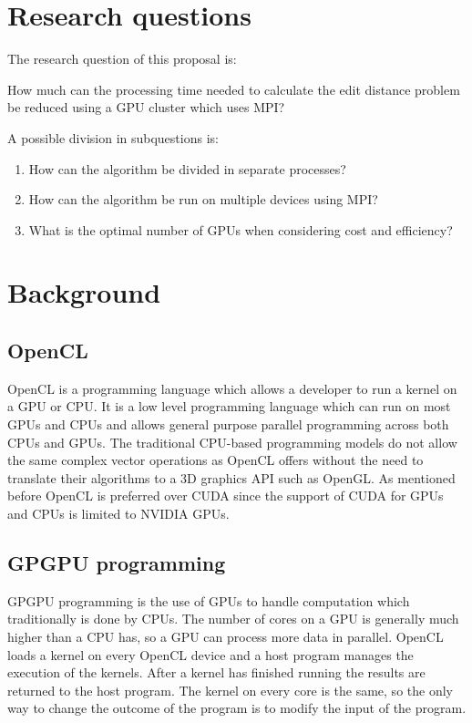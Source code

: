 \documentclass{sig-alternate-br}
\begin{document}
\section{Research questions}
The research question of this proposal is:

How much can the processing time needed to calculate the edit distance problem be reduced using a GPU cluster which uses MPI?

A possible division in subquestions is:
\begin{enumerate}
    \item How can the algorithm be divided in separate processes?
    \item How can the algorithm be run on multiple devices using MPI?
    \item What is the optimal number of GPUs when considering cost and efficiency?
\end{enumerate}

\section{Background}
\subsection{OpenCL}
OpenCL is a programming language which allows a developer to run a kernel on a GPU or CPU\cite{OpenCL}.
It is a low level programming language which can run on most GPUs and CPUs and allows general purpose parallel programming across both CPUs and GPUs.
The traditional CPU-based programming models do not allow the same complex vector operations as OpenCL offers without the need to translate their algorithms to a 3D graphics API such as OpenGL.
As mentioned before OpenCL is preferred over CUDA since the support of CUDA for GPUs and CPUs is limited to NVIDIA GPUs\cite{CUDA}.

\subsection{GPGPU programming}
GPGPU programming is the use of GPUs to handle computation which traditionally is done by CPUs.
The number of cores on a GPU is generally much higher than a CPU has, so a GPU can process more data in parallel.
OpenCL loads a kernel on every OpenCL device and a host program manages the execution of the kernels.
After a kernel has finished running the results are returned to the host program.
The kernel on every core is the same, so the only way to change the outcome of the program is to modify the input of the program.
\end{document}
